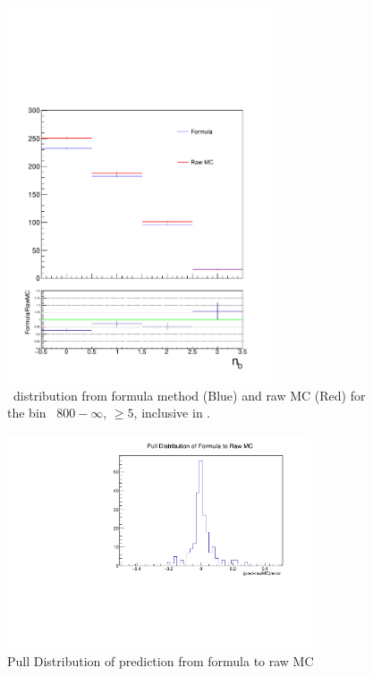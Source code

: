  \begin{figure}[h!]
  \centering
  \includegraphics[width=0.7\textwidth]{figures/btagformula/ge5j_800_0_Inc_GoodNb.pdf} 
  \caption{\label{fig:mhtShape_ge5j_ge3b_ht800} \nb~distribution from formula
   method (Blue) and raw MC (Red) for the bin \scalht~$800-\infty$, \njet $\geq 5$, inclusive
   in \mht.}
\end{figure}


 \begin{figure}[h!]
  \centering
  \includegraphics[width=0.8\textwidth]{figures/btagformula/pull.pdf} 
  \caption{\label{fig:pull} Pull Distribution of prediction from formula to raw MC}
\end{figure}

